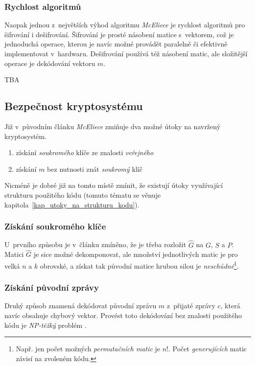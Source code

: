 \documentclass[thesis=M,czech,hidelinks]{FITthesis}[2012/06/26]
\newcommand{\0}{{\textcolor[gray]{0.80}{0}}}
\begin{document}
\subsubsection{Rychlost algoritmů}
Naopak jednou z~největších výhod algoritmu \emph{McEliece} je rychlost algoritmů
pro šifrování i dešifrování. Šifrování je prosté násobení matice s~vektorem, což
je jednoduchá operace, kterou je navíc možné provádět paralelně či efektivně
implementovat v~hardwaru. Dešifrování používá též násobení matic, ale složitější
operace je dekódování vektoru $\hat{m}$.

\textsc{TBA}

\subsection{Bezpečnost kryptosystému}
Již v~původním článku \cite{McEliece} \emph{McEliece} zmiňuje dva možné útoky na
navržený kryptosystém.
\begin{enumerate}
    \item získání \emph{soukromého} klíče ze znalosti \emph{veřejného}
    \item získání $m$ bez nutnosti znát \emph{soukromý} klíč
\end{enumerate}

Nicméně je dobré již na tomto místě zmínit, že existují útoky využívající
strukturu použitého kódu (tomuto tématu se věnuje
kapitola~\ref{kap_utoky_na_strukturu_kodu}).

\subsubsection{Získání soukromého klíče}
U~prvního způsobu je v~článku zmíněno, že je třeba rozložit $\hat{G}$ na $G$,
$S$ a $P$.  Matici $\hat{G}$ je sice možné dekomponovat, ale množství
jednotlivých matic je pro velká $n$ a $k$ obrovské, a získat tak původní matice
hrubou silou je \emph{neschůdné}\footnote{
    Např. jen počet možných \emph{permutačních matic} je $n!$. Počet
    \emph{generujících} matic závisí na zvoleném kódu.
}.


\subsubsection{Získání původní zprávy}
Druhý způsob znamená dekódovat původní zprávu $m$ z~přijaté zprávy $c$,
která navíc obsahuje chybový vektor. Provést toto dekódování bez znalosti
použitého kódu je \emph{NP-těžký} problém \cite{berlekamp}.
\end{document}
